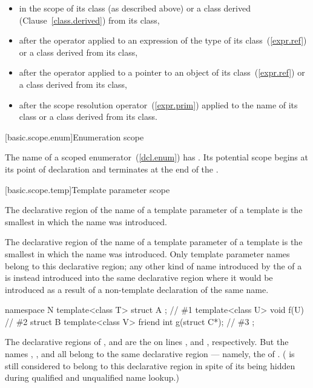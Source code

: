 \begin{itemize}
\item in the scope of its class (as described above) or a class derived
(Clause~\ref{class.derived}) from its class,
\item after the  operator applied to an expression of the type
of its class~(\ref{expr.ref}) or a class derived from its class,
\item after the \tcode{->} operator applied to a pointer to an object of
its class~(\ref{expr.ref}) or a class derived from its class,
\item after the \tcode{::} scope resolution operator~(\ref{expr.prim})
applied to the name of its class or a class derived from its class.
\end{itemize}

[basic.scope.enum]{Enumeration scope}%
%

\pnum
The name of a scoped enumerator~(\ref{dcl.enum}) has
. Its potential scope begins at
its point of declaration and terminates at the end of the
.

[basic.scope.temp]{Template parameter scope}%
%
%

\pnum
The declarative region of the name of a template parameter of a template
 is the smallest 
in which the name was introduced.

\pnum
The declarative region of the name of a template parameter of a template is the smallest
 in which the name was introduced. Only template
parameter names belong to this declarative region; any other kind of name introduced by
the  of a  is instead
introduced into the same declarative region where it would be introduced as a result of
a non-template declaration of the same name. \enterexample

\begin{codeblock}
namespace N {
  template<class T> struct A { };               // \#1
  template<class U> void f(U) { }               // \#2
  struct B {
    template<class V> friend int g(struct C*);  // \#3
  };
}
\end{codeblock}

The declarative regions of ,  and  are the
 on lines ,  and ,
respectively. But the names , ,  and  all belong to
the same declarative region --- namely, the  of .
( is still considered to belong to this declarative region in spite of its
being hidden during qualified and unqualified name lookup.)
\exitexample

